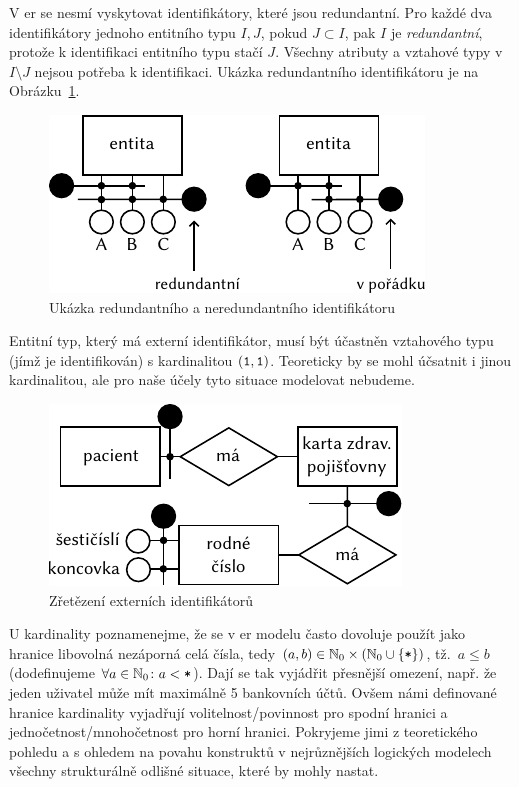 V \acrshort{er} se nesmí vyskytovat identifikátory, které jsou redundantní.
Pro každé dva identifikátory jednoho entitního typu $I, J$, pokud $J\subset I$, pak $I$ je \emph{redundantní}, protože k identifikaci entitního typu stačí $J$.
Všechny atributy a vztahové typy v $I\setminus J$ nejsou potřeba k identifikaci.
Ukázka redundantního identifikátoru je na Obrázku~\ref{fig:redundant-ids}.

\begin{figure}[!htb]
  \centering
  \includegraphics[width=\maxwidth{\textwidth}]{../img/er-model/redundant-ids.pdf}
  \caption{Ukázka redundantního a neredundantního identifikátoru}
  \label{fig:redundant-ids}
\end{figure}

Entitní typ, který má externí identifikátor, musí být účastněn vztahového typu (jímž je identifikován) s kardinalitou $(\texttt{1}, \texttt{1})$.
Teoreticky by se mohl účsatnit i jinou kardinalitou, ale pro naše účely tyto situace modelovat nebudeme.

\begin{figure}[!htb]
  \centering
  \includegraphics[width=\maxwidth{\textwidth}]{../img/er-model/external-id-chain.pdf}
  \caption{Zřetězení externích identifikátorů}
  \label{fig:er-external-identifier-chain}
\end{figure}

U kardinality poznamenejme, že se v \acrshort{er} modelu často dovoluje použít jako hranice libovolná nezáporná celá čísla, tedy $(a, b)\in \mathbb N_0\times \left(\mathbb N_0 \cup \left\{\texttt{*}\right\}\right)$, tž.~$a\leq b$ (dodefinujeme $\forall a\in\mathbb N_0\colon a < \texttt{*}$).
Dají se tak vyjádřit přesnější omezení, např. že jeden uživatel může mít maximálně 5 bankovních účtů.
Ovšem námi definované hranice kardinality vyjadřují volitelnost/povinnost pro spodní hranici a jednočetnost/mnohočetnost pro horní hranici.
Pokryjeme jimi z teoretického pohledu a s ohledem na povahu konstruktů v nejrůznějších logických modelech všechny strukturálně odlišné situace, které by mohly nastat.

